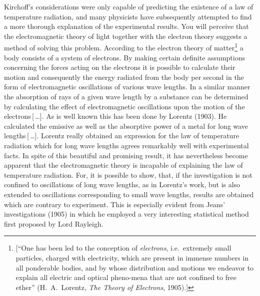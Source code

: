 Kirchoff's considerations were only capable of predicting the existence
of a law of temperature radiation, and many physicists have subsequently
attempted to find a more thorough explanation of the experimental
results. You will perceive that the electromagnetic theory of light
together with the electron theory suggests a method of solving this
problem. According to the electron theory of matter\footnote{{[}``One
  has been led to the conception of \emph{electrons}, i.e.\ extremely
  small particles, charged with electricity, which are present in
  immense numbers in all ponderable bodies, and by whose distribution
  and motions we endeavor to explain all electric and optical pheno-mena
  that are not confined to free ether'' (H.\ A.\ Lorentz, \emph{The Theory
  of Electrons}, 1905).{]}} a body consists of a system of electrons. By
making certain definite assumptions concerning the forces acting on the
electrons it is possible to calculate their motion and consequently the
energy radiated from the body per second in the form of electromagnetic
oscillations of various wave lengths. In a similar manner the absorption of 
rays of a given wave length by a substance can be determined by calculating 
the effect of electromagnetic oscillations upon the motion of the 
electrons\,[\,\ldots]. As is well known this has been done by Lorentz (1903). 
He calculated the emissive as well as the absorptive power of a metal for 
long wave lengths\,[\,\ldots]. Lorentz really obtained an expression for the law 
of temperature radiation which for long wave lengths agrees remarkably well
with experimental facts. In spite of this beautiful and promising
result, it has nevertheless become apparent that the electromagnetic
theory is incapable of explaining the law of temperature radiation. For,
it is possible to show, that, if the investigation is not confined to
oscillations of long wave lengths, as in Lorentz's work, but is also
extended to oscillations corresponding to small wave lengths, results
are obtained which are contrary to experiment. This is especially evident 
from Jeans’ investigations (1905) in which he employed a very interesting 
statistical method first proposed by Lord Rayleigh.

